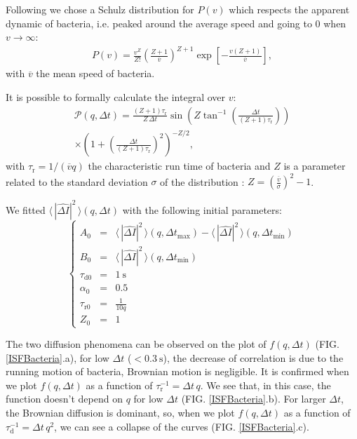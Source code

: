 \documentclass[%
 aip,
 jmp,%
 amsmath,amssymb,
reprint,%
]{revtex4-1}
\begin{document}
Following\citep{1_BactMobil} we chose a Schulz distribution for $P(v)$ which respects the apparent dynamic of bacteria, i.e. peaked around the average speed and going to 0 when $v \rightarrow \infty$:
\begin{multline}
P(v) = \frac{v^Z}{Z!} \left(\frac{Z+1}{\overline{v}}\right)^{Z+1} \exp\left[-\frac{v(Z+1)}{\overline{v}}\right],
\end{multline}
with $\overline{v}$ the mean speed of bacteria.

It is possible to formally calculate the integral over $v$:
\begin{multline}
\mathcal{P}(q, \Delta t) = \frac{(Z+1)\tau_\text{r}}{Z \, \Delta t} \sin\left(Z\tan^{-1}\left(\frac{\Delta t}{(Z+1)\tau_\text{r}}\right)\right)\\
\times \left(1+\left(\frac{\Delta t}{(Z+1)\tau_\text{r}}\right)^2\right)^{-Z/2},
\end{multline}
with $\tau_\text{r} = 1/(\overline{v}q)$ the characteristic run time of bacteria and $Z$ is a parameter related to the standard deviation $\sigma$ of the distribution : $Z = \left( \frac{\overline{v}}{\sigma} \right)^2 -1$. 

We fitted $\langle \, |\widehat{\Delta I}|^2 \, \rangle (q, \Delta t)$ with the following initial parameters:
\begin{equation}
\left\{
\begin{array}{rcl}
A_0 &=& \langle \, |\widehat{\Delta I}|^2 \, \rangle (q,\Delta t_\text{max}) - \langle \, |\widehat{\Delta I}|^2 \, \rangle (q,\Delta t_\text{min}) \\
B_0 &=& \langle \, |\widehat{\Delta I}|^2 \, \rangle (q,\Delta t_\text{min}) \\
\tau_\text{d0} &=& \SI{1}{\second}\\
\alpha_0 &=& 0.5\\
\tau_\text{r0} &=& \frac{1}{10 q}\\
Z_0 &=& 1
\end{array}
\right.
\end{equation}

The two diffusion phenomena can be observed on the plot of $f(q, \Delta t)$ (FIG. \ref{ISFBacteria}.a), for low $\Delta t$ ($< \SI{0.3}{\second}$), the decrease of correlation is due to the running motion of bacteria, Brownian motion is negligible. It is confirmed when we plot $f(q, \Delta t)$ as a function of $\tau_\text{r}^{-1} = \Delta t \, q$. We see that, in this case, the function doesn't depend on $q$ for low $\Delta t$ (FIG. \ref{ISFBacteria}.b). For larger $\Delta t$, the Brownian diffusion is dominant, so, when we plot $f(q, \Delta t)$ as a function of $\tau_\text{d}^{-1} = \Delta t \, q^2$, we can see a collapse of the curves (FIG. \ref{ISFBacteria}.c).
\end{document}
